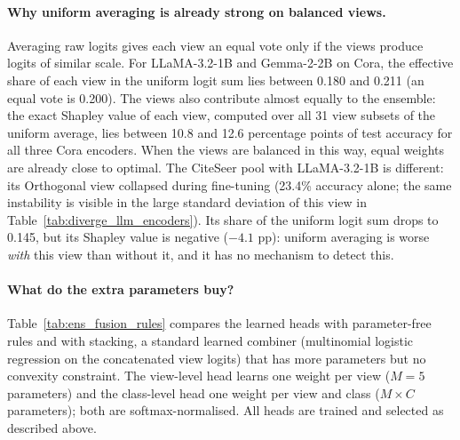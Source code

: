 \documentclass[a4paper,fleqn]{cas-sc}
\DeclareRobustCommand{\revcommon}[2][]{\textcolor{revshared}{#2}} %
\begin{document}
\paragraph{\revcommon{Why uniform averaging is already strong on balanced views.}}
\revcommon[R1,R2,R4]{Averaging raw logits gives each view an equal vote only if the views produce logits of similar scale. For LLaMA-3.2-1B and Gemma-2-2B on Cora, the effective share of each view in the uniform logit sum lies between 0.180 and 0.211 (an equal vote is 0.200). The views also contribute almost equally to the ensemble: the exact Shapley value of each view, computed over all 31 view subsets of the uniform average, lies between 10.8 and 12.6 percentage points of test accuracy for all three Cora encoders. When the views are balanced in this way, equal weights are already close to optimal. The CiteSeer pool with LLaMA-3.2-1B is different: its Orthogonal view collapsed during fine-tuning (23.4\% accuracy alone; the same instability is visible in the large standard deviation of this view in Table~\ref{tab:diverge_llm_encoders}). Its share of the uniform logit sum drops to 0.145, but its Shapley value is negative ($-4.1$ pp): uniform averaging is worse \emph{with} this view than without it, and it has no mechanism to detect this.}

\paragraph{\revcommon{What do the extra parameters buy?}}
\revcommon[R1,R2,R4]{Table~\ref{tab:ens_fusion_rules} compares the learned heads with parameter-free rules and with stacking, a standard learned combiner (multinomial logistic regression on the concatenated view logits) that has more parameters but no convexity constraint. The view-level head learns one weight per view ($M=5$ parameters) and the class-level head one weight per view and class ($M\times C$ parameters); both are softmax-normalised. All heads are trained and selected as described above.}
\end{document}
